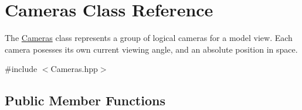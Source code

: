\hypertarget{class_cameras}{\section{Cameras Class Reference}
\label{class_cameras}
}


The \hyperlink{class_cameras}{Cameras} class represents a group of logical cameras for a model view. Each camera posesses its own current viewing angle, and an absolute position in space.  




{\ttfamily \#include $<$Cameras.\-hpp$>$}

\subsection*{Public Member Functions}
